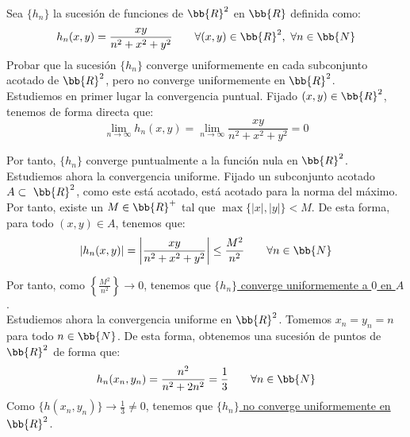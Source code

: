 \begin{ejercicio}
    Sea $\{h_n\}$ la sucesión de funciones de $\bb{R}^2$ en $\bb{R}$ definida como:
    \begin{equation*}
        h_n(x,y) = \frac{xy}{n^2+x^2+y^2} \qquad \forall (x,y)\in \bb{R}^2,~\forall n\in \bb{N}
    \end{equation*}
    Probar que la sucesión $\{h_n\}$ converge uniformemente en cada subconjunto acotado de $\bb{R}^2$,
    pero no converge uniformemente en $\bb{R}^2$.\\

    Estudiemos en primer lugar la convergencia puntual. Fijado $(x,y)\in \bb{R}^2$, tenemos de forma directa que:
    \begin{equation*}
        \lim_{n\to \infty} h_n(x,y) = \lim_{n\to \infty} \frac{xy}{n^2+x^2+y^2}=0
    \end{equation*}

    Por tanto, $\{h_n\}$ converge puntualmente a la función nula en $\bb{R}^2$.\\

    Estudiemos ahora la convergencia uniforme. Fijado un subconjunto acotado $A\subset~\bb{R}^2$, como este está acotado, está acotado para la norma del máximo. Por tanto, existe un $M\in \bb{R}^+$ tal que $\max\{|x|,|y|\}<M$. De esta forma, para todo $(x,y)\in A$, tenemos que:
    \begin{equation*}
        |h_n(x,y)| = \left|\frac{xy}{n^2+x^2+y^2}\right| \leq \frac{M^2}{n^2} \qquad \forall n\in \bb{N}
    \end{equation*}

    Por tanto, como $\left\{\frac{M^2}{n^2}\right\}\to 0$, tenemos que \ul{$\{h_n\}$ converge uniformemente a $0$ en $A$}.\\

    Estudiemos ahora la convergencia uniforme en $\bb{R}^2$. Tomemos $x_n=y_n=n$ para todo $n\in \bb{N}$. De esta forma, obtenemos una sucesión de puntos de $\bb{R}^2$ de forma que:
    \begin{equation*}
        h_n(x_n,y_n) = \frac{n^2}{n^2+2n^2} = \frac{1}{3} \qquad \forall n\in \bb{N}
    \end{equation*}
    Como $\{h(x_n,y_n)\}\to \frac{1}{3}\neq 0$, tenemos que \ul{$\{h_n\}$ no converge uniformemente en $\bb{R}^2$}.
\end{ejercicio}


